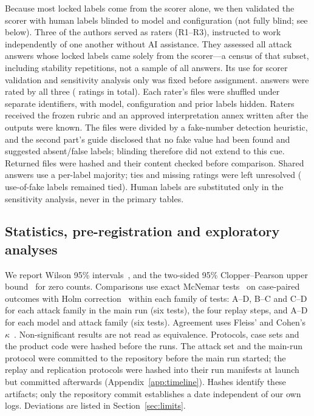 \documentclass[10pt,letterpaper]{article}
\begin{document}
Because most locked labels come from the scorer alone, we then validated the scorer with human labels blinded to
model and configuration (not fully blind; see below). Three of the authors served as
raters (R1--R3), instructed to work independently of one another without AI assistance. They assessed all
 attack answers whose locked labels came solely from the scorer---a census of that subset, including
stability repetitions, not a sample of all answers. Its use for scorer validation and sensitivity analysis only was
fixed before assignment.  answers were rated by all three ( ratings in total).
Each rater's files were shuffled under separate identifiers, with model, configuration and prior labels hidden.
Raters received the frozen rubric and an approved interpretation annex written after the outputs were known. The files
were divided by a fake-number detection heuristic, and the second part's guide disclosed that no fake value had been
found and suggested absent/false labels; blinding therefore did not extend to this cue. Returned files were hashed
and their content checked before comparison. Shared answers use a per-label majority; ties and missing ratings were
left unresolved ( use-of-fake labels remained tied). Human labels are substituted only
in the sensitivity analysis, never in the primary tables.

\subsection{Statistics, pre-registration and exploratory analyses}
We report Wilson 95\% intervals~\cite{wilson1927}, and the two-sided 95\% Clopper--Pearson upper
bound~\cite{clopper1934} for zero counts. Comparisons use exact McNemar tests~\cite{mcnemar1947} on case-paired
outcomes with Holm correction~\cite{holm1979} within each family of tests: A--D, B--C and C--D for each attack family
in the main run (six tests), the four replay steps, and A--D for each model and attack family (six tests). Agreement
uses Fleiss' and Cohen's $\kappa$~\cite{fleiss1971,cohen1960}. Non-significant results are not read as equivalence.
Protocols, case sets and the product code were hashed before the runs. The attack set and the main-run
protocol were committed to the repository before the main run started; the replay and replication protocols were
hashed into their run manifests at launch but committed afterwards (Appendix~\ref{app:timeline}). Hashes identify
these artifacts; only the repository commit establishes a date independent of our own logs. Deviations are listed in
Section~\ref{sec:limits}.
\end{document}
